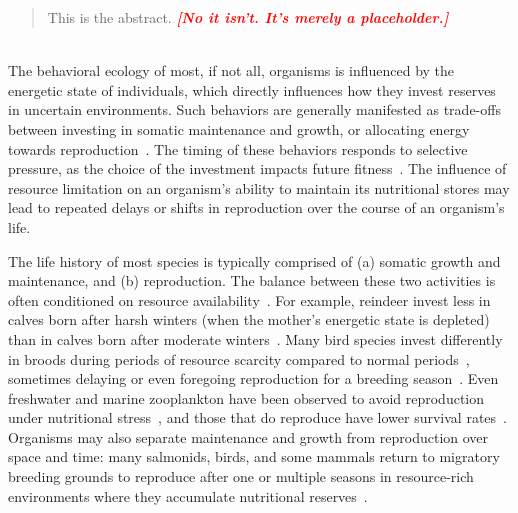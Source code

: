 \documentclass{pnastwo}
\newcommand{\sid}[1]{\textcolor{red}{\bf [#1]}}
\begin{document}
\begin{article}

\begin{abstract}
This is the abstract.  \emph{ \sid{No it isn't.  It's merely a placeholder.}}
\end{abstract}


 \\ The behavioral ecology of most, if
not all, organisms is influenced by the energetic state of individuals, which
directly influences how they invest reserves in uncertain environments.  Such
behaviors are generally manifested as trade-offs between investing in somatic
maintenance and growth, or allocating energy towards
reproduction~\cite{Martin:1987dl,Kirk:1997cc,Kempes:2012hy}.  The timing of
these behaviors responds to selective pressure, as the choice of the
investment impacts future fitness~\cite{Mangel:1988uaa}.  The influence of
resource limitation on an organism's ability to maintain its nutritional
stores may lead to repeated delays or shifts in reproduction over the course
of an organism's life.

The life history of most species is typically comprised of (a) somatic growth
and maintenance, and (b) reproduction.  The balance between these two
activities is often conditioned on resource
availability~\cite{Morris:1987eo}.  For example, reindeer invest less in
calves born after harsh winters (when the mother's energetic state is
depleted) than in calves born after moderate winters~\cite{Tveraa:2003fq}.
Many bird species invest differently in broods during periods of resource
scarcity compared to normal periods~\cite{Daan:1988va,Jacot:2009dv},
sometimes delaying or even foregoing reproduction for a breeding
season~\cite{Martin:1987dl,Stearns:1989ip,Barboza:2002in}.  Even freshwater
and marine zooplankton have been observed to avoid reproduction under
nutritional stress~\cite{Threlkeld:1976ih}, and those that do reproduce have
lower survival rates~\cite{Kirk:1997cc}.  Organisms may also separate
maintenance and growth from reproduction over space and time: many salmonids,
birds, and some mammals return to migratory breeding grounds to reproduce
after one or multiple seasons in resource-rich environments where they
accumulate nutritional
reserves~\cite{Weber:1998jg,Mduma:1999cp,Moore:2014hi}.


\end{article}
\end{document}
